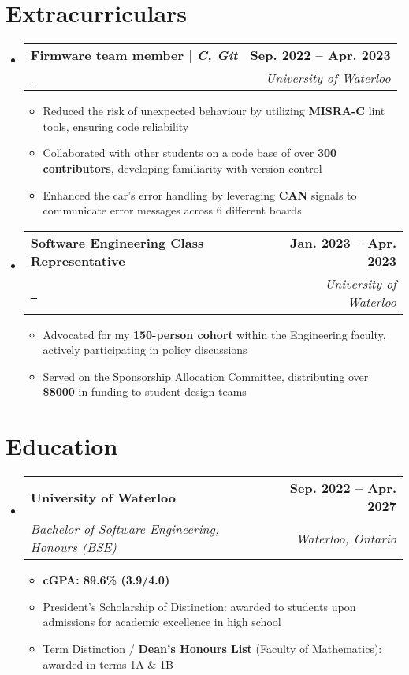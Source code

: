 \documentclass[letterpaper,11pt]{article}
\makeatletter
\newcommand{\resumeItem}[1]{
  \item\small{
    {#1 \vspace{-2pt}}
  }
}
\newcommand{\resumeSubheading}[4]{
  \vspace{-2pt}\item
    \begin{tabular*}{1.0\textwidth}[t]{l@{\extracolsep{\fill}}r}
      \textbf{#1} & \textbf{\small #2} \\
      \textit{\small#3} & \textit{\small #4} \\
    \end{tabular*}\vspace{-7pt}
}
\newcommand{\resumeSubHeadingListStart}{\begin{itemize}[leftmargin=0.0in, label={}]}
\newcommand{\resumeSubHeadingListEnd}{\end{itemize}}
\newcommand{\resumeItemListStart}{\begin{itemize}}
\newcommand{\resumeItemListEnd}{\end{itemize}\vspace{-5pt}}
\newcommand{\brokenUL}[1]{%
  \uline{\phantom{#1}}%
  \llap{\contour{white}{#1}}%
}
\makeatother
\begin{document}
\section{Extracurriculars}
    \resumeSubHeadingListStart
        \resumeSubheading
        {Firmware team member $|$ \textnormal{\normalem\emph{C, Git}}}
        {Sep. 2022 -- Apr. 2023}
        {\href{https://waterlooformulaelectric.com}{\raisebox{-0.2\height}\faExternalLink\ \brokenUL{Formula Electric Design Team}}}
        {University of Waterloo}
            \resumeItemListStart
                \resumeItem{Reduced the risk of unexpected behaviour by utilizing \textbf{MISRA-C} lint tools, ensuring code reliability}
                \resumeItem{Collaborated with other students on a code base of over \textbf{300 contributors}, developing familiarity with version control}
                \resumeItem{Enhanced the car's error handling by leveraging \textbf{CAN} signals to communicate error messages across 6 different boards}
            \resumeItemListEnd
        \resumeSubheading
        {Software Engineering Class Representative}
        {Jan. 2023 -- Apr. 2023}
        {\href{https://www.engsoc.uwaterloo.ca}{\raisebox{-0.2\height}\faExternalLink\ \brokenUL{Engineering Society}}}
        {University of Waterloo}
            \resumeItemListStart
                \resumeItem{Advocated for my \textbf{150-person cohort} within the Engineering faculty, actively participating in policy discussions}
                \resumeItem{Served on the Sponsorship Allocation Committee, distributing over \textbf{\$8000} in funding to student design teams}
            \resumeItemListEnd
    \resumeSubHeadingListEnd

\section{Education}
    \resumeSubHeadingListStart
        \resumeSubheading
        {University of Waterloo}{Sep. 2022 -- Apr. 2027}
        {Bachelor of Software Engineering, Honours (BSE)}{Waterloo, Ontario}
        \resumeItemListStart
            \resumeItem{\textbf{cGPA: 89.6\% (3.9/4.0)}}
            \resumeItem{President's Scholarship of Distinction: awarded to students upon admissions for academic excellence in high school}
            \resumeItem{Term Distinction / \textbf{Dean's Honours List} (Faculty of Mathematics): awarded in terms 1A \& 1B}
        \resumeItemListEnd
    \resumeSubHeadingListEnd
\end{document}
